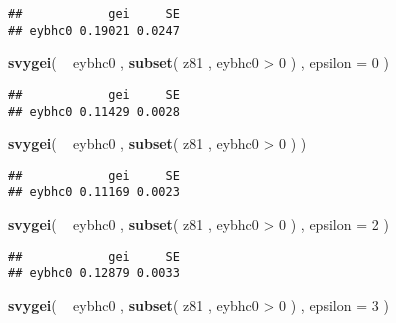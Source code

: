 \documentclass[]{book}
\newenvironment{Shaded}{\begin{snugshade}}{\end{snugshade}}
\newcommand{\KeywordTok}[1]{\textcolor[rgb]{0.13,0.29,0.53}{\textbf{{#1}}}}
\newcommand{\DataTypeTok}[1]{\textcolor[rgb]{0.13,0.29,0.53}{{#1}}}
\newcommand{\DecValTok}[1]{\textcolor[rgb]{0.00,0.00,0.81}{{#1}}}
\newcommand{\StringTok}[1]{\textcolor[rgb]{0.31,0.60,0.02}{{#1}}}
\newcommand{\NormalTok}[1]{{#1}}
\theoremstyle{definition}
\theoremstyle{definition}
\theoremstyle{remark}
\begin{document}
\begin{verbatim}
##            gei     SE
## eybhc0 0.19021 0.0247
\end{verbatim}

\begin{Shaded}
\begin{Highlighting}[]
\KeywordTok{svygei}\NormalTok{( ~}\StringTok{ }\NormalTok{eybhc0 , }\KeywordTok{subset}\NormalTok{( z81 , eybhc0 >}\StringTok{ }\DecValTok{0} \NormalTok{) , }\DataTypeTok{epsilon =} \DecValTok{0} \NormalTok{)}
\end{Highlighting}
\end{Shaded}

\begin{verbatim}
##            gei     SE
## eybhc0 0.11429 0.0028
\end{verbatim}

\begin{Shaded}
\begin{Highlighting}[]
\KeywordTok{svygei}\NormalTok{( ~}\StringTok{ }\NormalTok{eybhc0 , }\KeywordTok{subset}\NormalTok{( z81 , eybhc0 >}\StringTok{ }\DecValTok{0} \NormalTok{) )}
\end{Highlighting}
\end{Shaded}

\begin{verbatim}
##            gei     SE
## eybhc0 0.11169 0.0023
\end{verbatim}

\begin{Shaded}
\begin{Highlighting}[]
\KeywordTok{svygei}\NormalTok{( ~}\StringTok{ }\NormalTok{eybhc0 , }\KeywordTok{subset}\NormalTok{( z81 , eybhc0 >}\StringTok{ }\DecValTok{0} \NormalTok{) , }\DataTypeTok{epsilon =} \DecValTok{2} \NormalTok{)}
\end{Highlighting}
\end{Shaded}

\begin{verbatim}
##            gei     SE
## eybhc0 0.12879 0.0033
\end{verbatim}

\begin{Shaded}
\begin{Highlighting}[]
\KeywordTok{svygei}\NormalTok{( ~}\StringTok{ }\NormalTok{eybhc0 , }\KeywordTok{subset}\NormalTok{( z81 , eybhc0 >}\StringTok{ }\DecValTok{0} \NormalTok{) , }\DataTypeTok{epsilon =} \DecValTok{3} \NormalTok{)}
\end{Highlighting}
\end{Shaded}
\end{document}
